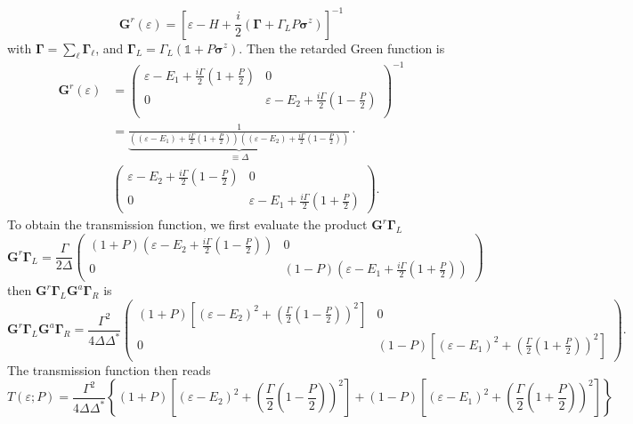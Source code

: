 \documentclass{article}
\renewcommand{\vec}[1]{\mathbf{#1}}
\begin{document}
\begin{equation}
	\vec{G}^r(\varepsilon) = \left[\varepsilon - H + \frac{i}{2}(\bm{\Gamma} + \Gamma_LP\bm{\sigma}^z)\right]^{-1}
\end{equation}
with $\bm{\Gamma} = \sum_\ell\bm{\Gamma}_\ell$, and $\bm{\Gamma}_L = \Gamma_L(\mathds{1}+P\bm{\sigma}^z)$. Then the retarded Green function is 
\begin{align}
	\vec{G}^r(\varepsilon) &= \begin{pmatrix}
		\varepsilon-E_1+\frac{i\Gamma}{2}(1 + \frac{P}{2}) & 0 \\
		0 & \varepsilon-E_2+\frac{i\Gamma}{2}(1 - \frac{P}{2}) \\
	\end{pmatrix}^{-1}\\
	&=\underbrace{\frac{1}{((\varepsilon-E_1) + \frac{i\Gamma}{2}(1+\frac{P}{2}))((\varepsilon-E_2) + \frac{i\Gamma}{2}(1-\frac{P}{2}))}}_{\equiv \Delta}\cdot\\
	& \begin{pmatrix}
		\varepsilon-E_2+\frac{i\Gamma}{2}(1 - \frac{P}{2}) & 0 \\
		0 &\varepsilon-E_1+\frac{i\Gamma}{2}(1 + \frac{P}{2})
	\end{pmatrix}.
\end{align}
To obtain the transmission function, we first evaluate the product $\vec{G}^r \bm{\Gamma}_L$
\begin{equation}
	\vec{G}^r \bm{\Gamma}_L = \frac{\Gamma}{2\Delta} \begin{pmatrix}
		(1+P)(\varepsilon-E_2+\frac{i\Gamma}{2}(1 - \frac{P}{2})) & 0 \\
		0 &(1-P)(\varepsilon-E_1+\frac{i\Gamma}{2}(1 + \frac{P}{2}))
	\end{pmatrix} 
\end{equation}
then $\vec{G}^r\bm{\Gamma}_L\vec{G}^a \bm{\Gamma}_R$ is
\begin{equation}
	\vec{G}^r\bm{\Gamma}_L\vec{G}^a \bm{\Gamma}_R = \frac{\Gamma^2}{4\Delta\Delta^*}\begin{pmatrix}
		(1+P)[(\varepsilon-E_2)^2+(\frac{\Gamma}{2}(1 - \frac{P}{2}))^2] & 0 \\
		0 &(1-P)[(\varepsilon-E_1)^2+(\frac{\Gamma}{2}(1 + \frac{P}{2}))^2]
	\end{pmatrix}.
\end{equation}
The transmission function then reads
\begin{equation}
	T(\varepsilon;P) = \frac{\Gamma^2}{4\Delta\Delta^*} \left\{(1+P)\left[(\varepsilon-E_2)^2+\left(\frac{\Gamma}{2}\left(1 - \frac{P}{2}\right)\right)^2\right] + (1-P)\left[(\varepsilon-E_1)^2+\left(\frac{\Gamma}{2}\left(1 + \frac{P}{2}\right)\right)^2\right]\right\} \label{eq:TransmissionAnalytical}
\end{equation}
\end{document}
